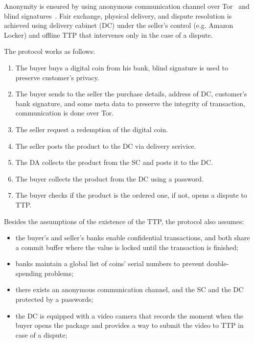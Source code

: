 Anonymity is ensured by using anonymous communication channel over Tor~\cite{dingledineTorSecondGenerationOnion2004} and blind signatures~\cite{chaumSecurityIdentificationTransaction1985}. Fair exchange, physical delivery, and dispute resolution is achieved using delivery cabinet (DC) under the seller's control (e.g. Amazon Locker) and offline TTP that intervenes only in the case of a dispute.

The protocol works as follows: 

\begin{enumerate}
    \item The buyer buys a digital coin from his bank, blind signature is used to preserve customer's privacy.
    \item The buyer sends to the seller the purchase details, address of DC, customer's bank signature, and some meta data to preserve the integrity of transaction, communication is done over Tor.
    \item The seller request a redemption of the digital coin.
    \item The seller posts the product to the DC via delivery serivice.
    \item The DA collects the product from the SC and posts it to the DC.
    \item The buyer collects the product from the DC using a password.
    \item The buyer checks if the product is the ordered one, if not, opens a dispute to TTP.
\end{enumerate}

Besides the assumptions of the existence of the TTP, the protocol also assumes:

\begin{itemize}
    \item the buyer's and seller's banks enable confidential transactions, and both share a commit buffer where the value is locked until the transaction is finished;
    \item banks maintain a global list of coins' serial numbers to prevent double-spending problems;
    \item there exists an anonymous communication channel, and the SC and the DC protected by a passwords;
    \item the DC is equipped with a video camera that records the moment when the buyer opens the package and provides a way to submit the video to TTP in case of a dispute;
\end{itemize}


